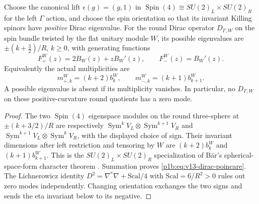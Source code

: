 \documentclass[11pt]{article}
\begin{document}
\begin{theorem}
\label{p1b:thm:v13-dirac-generating}
Choose the canonical lift $\epsilon(g)=(g,1)$ in
$\operatorname{Spin}(4)\cong SU(2)_L\times SU(2)_R$ for the left
$\Gamma$ action, and choose the spin orientation so that its invariant
Killing spinors have \emph{positive} Dirac eigenvalue.  For the
round Dirac operator $D_{\Gamma,W}$ on the spin bundle twisted by the
flat unitary module $W$, its possible eigenvalues are
$\pm(k+\tfrac32)/R$, $k\geq0$, with generating functions
\begin{equation}
\label{p1b:eq:v13-dirac-poincare}
 \boxed{F_+^W(z)=2B_W(z)+zB_W'(z),\qquad
 F_-^W(z)=B_W'(z).}
\end{equation}
Equivalently the actual multiplicities are
\begin{equation}
\label{p1b:eq:v13-dirac-multiplicities}
 \boxed{m_{+,k}^W=(k+2)b_k^W,\qquad
 m_{-,k}^W=(k+1)b_{k+1}^W.}
\end{equation}
A possible eigenvalue is absent if its multiplicity vanishes.  In
particular, no $D_{\Gamma,W}$ on these positive-curvature round
quotients has a zero mode.
\end{theorem}
\begin{proof}
The two $\operatorname{Spin}(4)$ eigenspace modules on the round
three-sphere at $\pm(k+3/2)/R$ are respectively
$\operatorname{Sym}^{k}V_L\otimes\operatorname{Sym}^{k+1}V_R$
and
$\operatorname{Sym}^{k+1}V_L\otimes\operatorname{Sym}^{k}V_R$,
with the displayed choice of sign.  Their invariant dimensions after
left restriction and tensoring by $W$ are $(k+2)b_k^W$ and
$(k+1)b_{k+1}^W$.  This is the $SU(2)_L\times SU(2)_R$ specialization
of B\"ar's spherical-space-form character theorem
\cite{Baer1996DiracSpaceForms,Baer2000SpinStructure}.
Summation proves \eqref{p1b:eq:v13-dirac-poincare}.
The Lichnerowicz identity
$D^2=\nabla^*\nabla+\mathrm{Scal}/4$ with
$\mathrm{Scal}=6/R^2>0$ rules out zero modes independently.
Changing orientation exchanges the two signs and sends the eta
invariant below to its negative.
\end{proof}
\end{document}
